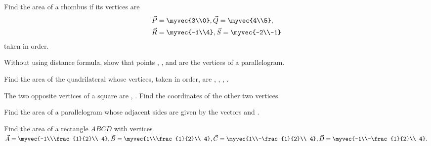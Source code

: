 \item Find the area of a rhombus if its vertices are 
\begin{align}
\vec{P} &= \myvec{3\\0}, \vec{Q} =\myvec{4\\5},
\\
\vec{R} &= \myvec{-1\\4}, \vec{S} = \myvec{-2\\-1} 
\end{align}
taken in order.
\\
\solution

\item Without using distance formula, show that points , ,  and  are the vertices of a parallelogram.
\\
\solution

\item  Find the area of the quadrilateral whose vertices, taken in order, are 
 ,  ,  ,  . 
\\
\solution

\item The two opposite vertices of a square are ,  . Find the coordinates of the other two vertices.
\\
\solution

\item Find the area of a parallelogram whose adjacent sides are given by the vectors  and .
\\
\solution

\item Find the area of a rectangle $ABCD$ with vertices
$\vec{A} = \myvec{-1\\\frac{1}{2}\\ 4},
 \vec{B} = \myvec{1\\\frac{1}{2}\\ 4},
\vec{C} = \myvec{1\\-\frac{1}{2}\\ 4},
\vec{D} = \myvec{-1\\-\frac{1}{2}\\ 4}.
$
\\
\solution


%
